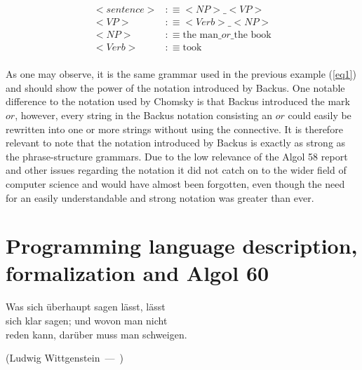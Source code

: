 \documentclass{article}
\let\oldquote\quote
\let\endoldquote\endquote
\renewenvironment{quote}[2][]
{\if\relax\detokenize{#1}\relax
	\def\quoteauthor{#2}%
	\else
	\def\quoteauthor{#2~---~#1}%
	\fi
	\oldquote}
{\par\nobreak\smallskip\hfill(\quoteauthor)%
	\endoldquote\addvspace{\bigskipamount}}
\begin{document}
\begin{equation} \label{eq2}
	\begin{split}
		<sentence> &:\equiv<NP>\_<VP> \\
		<VP> &:\equiv<Verb>\_<NP > \\
		<NP> &:\equiv\text{the man}\_or\_\text{the book} \\
		<Verb> &:\equiv\text{took} \\
	\end{split}
\end{equation}

As one may observe, it is the same grammar used in the previous example (\ref{eq1}) and should show the power of the notation introduced by Backus. One notable difference to the notation used by Chomsky is that Backus introduced the mark $or$, however, every string in the Backus notation consisting an $or$ could easily be rewritten into one or more strings without using the connective. It is therefore relevant to note that the notation introduced by Backus is exactly as strong as the phrase-structure grammars. Due to the low relevance of the Algol 58 report and other issues regarding the notation it did not catch on to the wider field of computer science and would have almost been forgotten, even though the need for an easily understandable and strong notation was greater than ever.

\section{Programming language description, formalization and Algol 60}

\begin{quote}{Ludwig Wittgenstein}
	\begin{flushright}
		Was sich überhaupt sagen lässt, lässt \\ sich klar sagen; und wovon man nicht \\ reden kann, darüber muss man schweigen.
	\end{flushright}
\end{quote}
\end{document}
